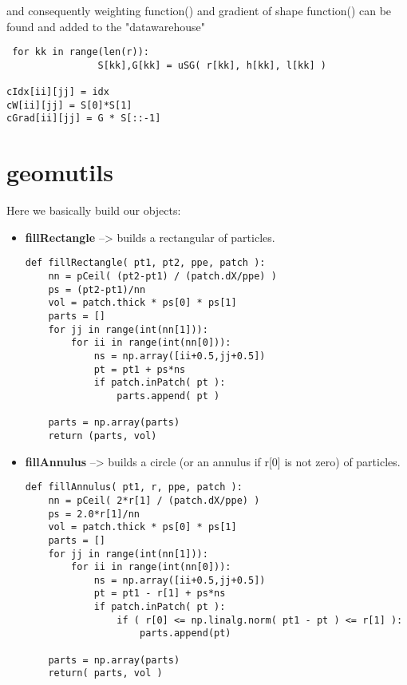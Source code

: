 and consequently weighting function() and gradient of shape function() can be found and added to the "datawarehouse"

\begin{lstlisting}
 for kk in range(len(r)):
                S[kk],G[kk] = uSG( r[kk], h[kk], l[kk] )

cIdx[ii][jj] = idx
cW[ii][jj] = S[0]*S[1]
cGrad[ii][jj] = G * S[::-1] 
\end{lstlisting}







\chapter{geomutils}
\label{chap:geomutils}
Here we basically build our objects:
\begin{itemize}
\item  \textbf{fillRectangle} --> builds a rectangular of particles.

\begin{lstlisting}
def fillRectangle( pt1, pt2, ppe, patch ):
    nn = pCeil( (pt2-pt1) / (patch.dX/ppe) )
    ps = (pt2-pt1)/nn
    vol = patch.thick * ps[0] * ps[1]
    parts = []
    for jj in range(int(nn[1])):
        for ii in range(int(nn[0])):
            ns = np.array([ii+0.5,jj+0.5])
            pt = pt1 + ps*ns
            if patch.inPatch( pt ):
                parts.append( pt )
                
    parts = np.array(parts)
    return (parts, vol)
\end{lstlisting}

\item  \textbf{fillAnnulus} --> builds a circle (or an annulus if r[0] is not zero) of particles.
\begin{lstlisting}
def fillAnnulus( pt1, r, ppe, patch ):
    nn = pCeil( 2*r[1] / (patch.dX/ppe) )
    ps = 2.0*r[1]/nn
    vol = patch.thick * ps[0] * ps[1]
    parts = []
    for jj in range(int(nn[1])):
        for ii in range(int(nn[0])):
            ns = np.array([ii+0.5,jj+0.5])
            pt = pt1 - r[1] + ps*ns
            if patch.inPatch( pt ):
                if ( r[0] <= np.linalg.norm( pt1 - pt ) <= r[1] ):
                    parts.append(pt)

    parts = np.array(parts)
    return( parts, vol )
\end{lstlisting}
\end{itemize}

